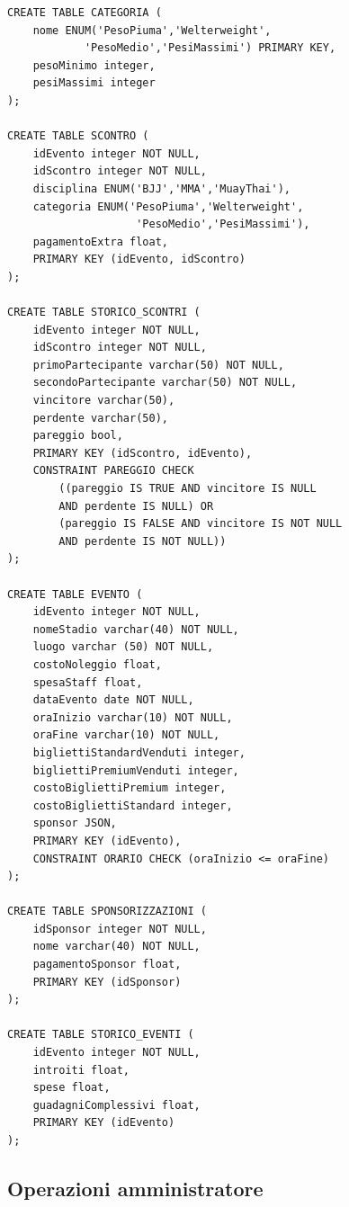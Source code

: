 \documentclass[a4paper,12pt]{report}
\begin{document}
\begin{verbatim}
CREATE TABLE CATEGORIA (
    nome ENUM('PesoPiuma','Welterweight',
            'PesoMedio','PesiMassimi') PRIMARY KEY,
    pesoMinimo integer,
    pesiMassimi integer 
);

CREATE TABLE SCONTRO (
    idEvento integer NOT NULL,
    idScontro integer NOT NULL,
    disciplina ENUM('BJJ','MMA','MuayThai'),
    categoria ENUM('PesoPiuma','Welterweight',
                    'PesoMedio','PesiMassimi'),
    pagamentoExtra float,
    PRIMARY KEY (idEvento, idScontro)
);

CREATE TABLE STORICO_SCONTRI (
    idEvento integer NOT NULL,
    idScontro integer NOT NULL,
    primoPartecipante varchar(50) NOT NULL,
    secondoPartecipante varchar(50) NOT NULL,
    vincitore varchar(50),
    perdente varchar(50),
    pareggio bool,
    PRIMARY KEY (idScontro, idEvento),
    CONSTRAINT PAREGGIO CHECK 
        ((pareggio IS TRUE AND vincitore IS NULL 
        AND perdente IS NULL) OR
        (pareggio IS FALSE AND vincitore IS NOT NULL 
        AND perdente IS NOT NULL))
);

CREATE TABLE EVENTO (
    idEvento integer NOT NULL,
    nomeStadio varchar(40) NOT NULL,
    luogo varchar (50) NOT NULL,
    costoNoleggio float,
    spesaStaff float,
    dataEvento date NOT NULL,
    oraInizio varchar(10) NOT NULL,
    oraFine varchar(10) NOT NULL,
    bigliettiStandardVenduti integer,
    bigliettiPremiumVenduti integer,
    costoBigliettiPremium integer,
    costoBigliettiStandard integer,
    sponsor JSON,
    PRIMARY KEY (idEvento),
    CONSTRAINT ORARIO CHECK (oraInizio <= oraFine)
);

CREATE TABLE SPONSORIZZAZIONI (
    idSponsor integer NOT NULL,
    nome varchar(40) NOT NULL,
    pagamentoSponsor float,
    PRIMARY KEY (idSponsor)
);

CREATE TABLE STORICO_EVENTI (
    idEvento integer NOT NULL,
    introiti float,
    spese float,
    guadagniComplessivi float,
    PRIMARY KEY (idEvento)
);
\end{verbatim}
\subsection{Operazioni amministratore}
\end{document}
